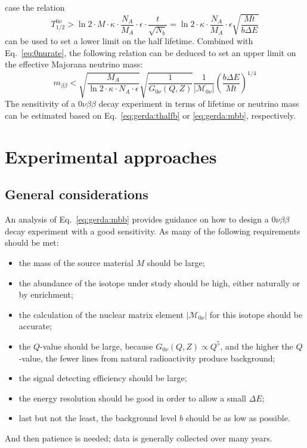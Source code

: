case the relation
\begin{equation}
\label{eq:gerda:thalfb}
T^{0\nu}_{1/2} > \ln2 \cdot M \cdot \kappa \cdot \frac{N_{A}}{M_{A}} 
\cdot \epsilon \cdot \frac{t}{\sqrt{N_{b}}} = \ln2 \cdot \kappa \cdot 
\frac{N_{A}}{M_{A}} \cdot \epsilon \sqrt{\frac{M t}{b \Delta E}}
\end{equation}
can be used to set a lower limit on the half lifetime. Combined with
Eq.~\ref{eq:0nurate}, the following relation can be deduced to set an
upper limit on the effective Majorana neutrino mass:
\begin{equation}
\label{eq:gerda:mbb}
m_{\beta\beta} < \sqrt{\frac{M_{A}}{\ln2 \cdot \kappa \cdot N_{A} \cdot 
\epsilon}} \sqrt{\frac{1}{G_{0\nu}(Q,Z)}} \frac{1}{|\mathcal{M}_{0\nu}|} 
(\frac{b \Delta E}{M t})^{1/4}
\end{equation}
The sensitivity of a $0\nu\beta\beta$ decay experiment in terms of
lifetime or neutrino mass can be estimated based on
Eq.~\ref{eq:gerda:thalfb} or \ref{eq:gerda:mbb}, respectively.

\section{Experimental approaches}
\label{sec:exp:appr}
\subsection{General considerations}
\label{sec:gencon}
An analysis of Eq.~\ref{eq:gerda:mbb} provides guidance on how to
design a $0\nu\beta\beta$ decay experiment with a good sensitivity. As
many of the following requirements should be met:
\begin{itemize}
\item the mass of the source material $M$ should be large;
\item the abundance of the isotope under study should be high, either
naturally or by enrichment;
\item the calculation of the nuclear matrix element
$|\mathcal{M}_{0\nu}|$ for this isotope should be accurate;
\item the $Q$-value should be large, because $G_{0\nu}(Q,Z) \propto
Q^{5}$, and the higher the $Q$-value, the fewer lines from natural
radioactivity produce background;
\item the signal detecting efficiency should be large;
\item the energy resolution should be good in order to allow a small
$\Delta E$;
\item last but not the least, the background level $b$ should be as
low as possible.
\end{itemize}
And then patience is needed; data is generally collected over many
years.

